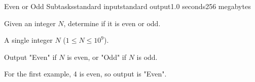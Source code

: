 \begin{problem}{Even or Odd Subtasks}{standard input}{standard output}{1.0 seconds}{256 megabytes}

Given an integer $N$, determine if it is even or odd.

A single integer $N$ ($1 \le N \le 10^9$).

\outputfile
Output "Even" if $N$ is even, or "Odd" if $N$ is odd.

\example


\note
For the first example, 4 is even, so output is "Even".

\end{problem}
